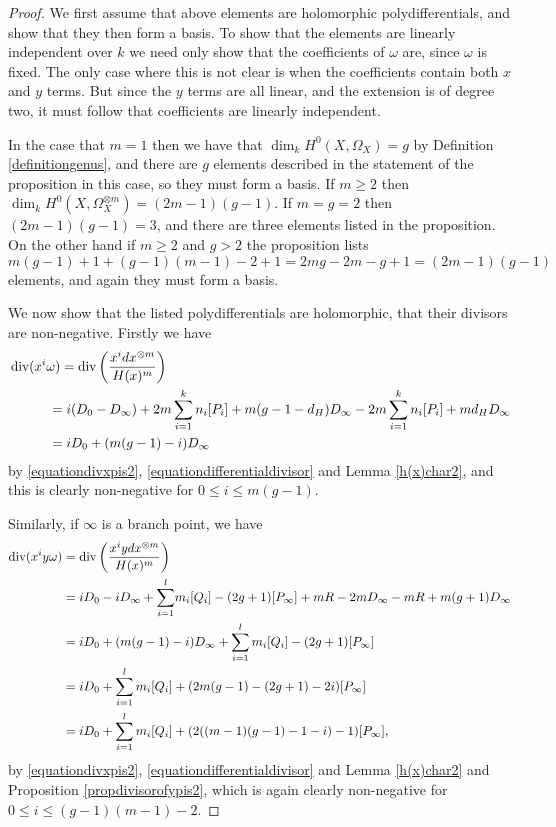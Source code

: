     \begin{proof}
    We first assume that above elements are holomorphic polydifferentials, and show that they then form a basis.
    To show that the elements are linearly independent over $k$ we need only show that the coefficients of $\omega$ are, since $\omega$ is fixed.
    The only case where this is not clear is when the coefficients contain both $x$ and $y$ terms.
    But since the $y$ terms are all linear, and the extension is of degree two, it must follow that coefficients are linearly independent.
    
    
    In the case that $m=1$ then we have that $\dim_k H^0(X,\Omega_X) =g$ by Definition \ref{definitiongenus}, and there are $g$ elements described in the statement of the proposition in this case, so they must form a basis.
    If $m \geq 2$ then $\dim_k H^0(X,\Omega_X^{\otimes m}) = (2m-1)(g-1)$.
    If $m=g=2$ then $(2m-1)(g-1) = 3$, and there are three elements listed in the proposition.
    On the other hand if $m\geq 2$ and $g > 2$ the proposition lists
        \[
        m(g-1)+1 + (g-1)(m-1)-2+1 = 2mg -2m -g +1 = (2m-1)(g-1)
        \]
    elements, and again they must form a basis.
    
    We now show that the listed polydifferentials are holomorphic, \ie that their divisors are non-negative.
    Firstly we have
        \begin{align*}
        & \operatorname{div}(x^i\omega)  =  \operatorname{div} \left( \frac{x^i dx^{\otimes m}}{H(x)^m} \right)\\ 
        & \hskip 3em =  i(D_0 - D_\infty) +2m\sum_{i=1}^k n_i[P_i] + m(g-1-d_H)D_\infty -2m\sum_{i=1}^k n_i [P_i] + md_HD_\infty \\
        & \hskip 3em =  iD_0 + (m(g-1) -i)D_\infty
        \end{align*}
    by \eqref{equationdivxpis2}, \eqref{equationdifferentialdivisor} and Lemma \ref{h(x)char2}, and this is clearly non-negative for $0\leq i \leq m(g-1)$.
    
    Similarly, if $\infty$ is a branch point, we have
        \begin{align*}
        \operatorname{div}(x^iy\omega) & =  \operatorname{div} \left( \frac{x^i ydx^{\otimes m}}{H(x)^m} \right)\\ 
        & = iD_0 - iD_\infty + {\displaystyle \sum_{i=1}^l} m_i[Q_i] -(2g+1)[P_\infty] + mR - 2mD_\infty - mR + m(g+1)D_\infty \\
        & =  iD_0 + (m(g-1) -i)D_\infty + \sum_{i=1}^l m_i[Q_i] - (2g+1)[P_\infty] \\
        & =  iD_0 +  \sum_{i=1}^l m_i[Q_i] + (2m(g-1) -(2g+1) -2i)[P_\infty] \\
        & =  iD_0 +  \sum_{i=1}^l m_i[Q_i] + (2((m-1)(g-1) -1 -i)-1)[P_\infty],
        \end{align*}
    by \eqref{equationdivxpis2}, \eqref{equationdifferentialdivisor} and Lemma \ref{h(x)char2} and Proposition \ref{propdivisorofypis2}, which is again clearly non-negative for $0 \leq i \leq (g-1)(m-1)-2$.


\end{proof}
